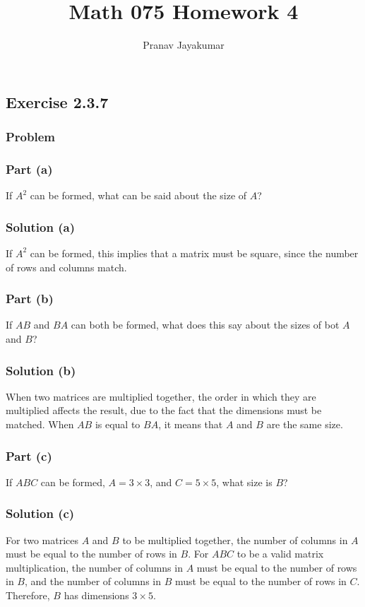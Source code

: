 \documentclass[12pt]{article}
\title{Math 075 Homework 4}
\author{Pranav Jayakumar}
\begin{document}
\maketitle

\subsection*{Exercise 2.3.7}
\vspace{0.25in}
\subsubsection*{Problem}
\vspace{0.25in}
\subsubsection*{Part (a)}
If $A^2$ can be formed, what can be said about the size of $A$?\\ 
\subsubsection*{Solution (a)}
If $A^2$ can be formed, this implies that a matrix must be square, since the number of rows and columns match.\\ 
\vspace{0.25in}
\subsubsection*{Part (b)}
If $AB$ and $BA$ can both be formed, what does this say about the sizes of bot $A$ and $B$?\\ 
\subsubsection*{Solution (b)}
When two matrices are multiplied together, the order in which they are multiplied affects the result, due to the fact that the dimensions must be matched. When $AB$ is equal to $BA$, it means that $A$ and $B$ are the same size.
\vspace{0.25in}
\subsubsection*{Part (c)}
If $ABC$ can be formed, $A = 3\times 3$, and $C = 5 \times 5$, what size is $B$?\\ 
\subsubsection*{Solution (c)}
For two matrices $A$ and $B$ to be multiplied together, the number of columns in $A$ must be equal to the number of rows in $B$. For $ABC$ to be a valid matrix multiplication, the number of columns in $A$ must be equal to the number of rows in $B$, and the number of columns in $B$ must be equal to the number of rows in $C$. Therefore, $B$ has dimensions $3 \times 5$.\\ 
\vspace{2in}
\end{document}
